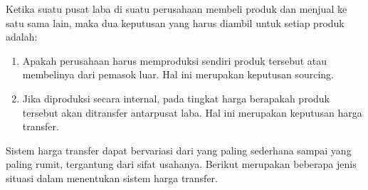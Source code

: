 Ketika suatu pusat laba di suatu perusahaan membeli produk dan menjual ke satu sama lain, maka dua keputusan yang harus diambil untuk setiap produk adalah:

\begin{enumerate}
	\item Apakah perusahaan harus memproduksi sendiri produk tersebut atau membelinya dari pemasok luar. Hal ini merupakan keputusan sourcing.

	\item Jika diproduksi secara internal, pada tingkat harga berapakah produk tersebut akan ditransfer antarpusat laba. Hal ini merupakan keputusan harga transfer.
\end{enumerate}

Sistem harga transfer dapat bervariasi dari yang paling sederhana sampai yang paling rumit, tergantung dari sifat usahanya. Berikut merupakan beberapa jenis situasi dalam menentukan sistem harga transfer.

